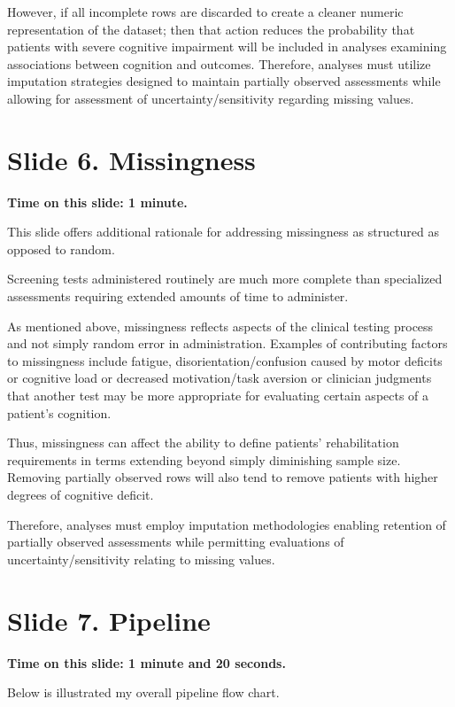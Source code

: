 \documentclass[
  11pt,
]{article}
\begin{document}
However, if all incomplete rows are discarded to create a cleaner
numeric representation of the dataset; then that action reduces the
probability that patients with severe cognitive impairment will be
included in analyses examining associations between cognition and
outcomes. Therefore, analyses must utilize imputation strategies
designed to maintain partially observed assessments while allowing for
assessment of uncertainty/sensitivity regarding missing values.

\section{Slide 6. Missingness}\label{slide-6.-missingness}

\textbf{Time on this slide: 1 minute.}

This slide offers additional rationale for addressing missingness as
structured as opposed to random.

Screening tests administered routinely are much more complete than
specialized assessments requiring extended amounts of time to
administer.

As mentioned above, missingness reflects aspects of the clinical testing
process and not simply random error in administration. Examples of
contributing factors to missingness include fatigue,
disorientation/confusion caused by motor deficits or cognitive load or
decreased motivation/task aversion or clinician judgments that another
test may be more appropriate for evaluating certain aspects of a
patient's cognition.

Thus, missingness can affect the ability to define patients'
rehabilitation requirements in terms extending beyond simply diminishing
sample size. Removing partially observed rows will also tend to remove
patients with higher degrees of cognitive deficit.

Therefore, analyses must employ imputation methodologies enabling
retention of partially observed assessments while permitting evaluations
of uncertainty/sensitivity relating to missing values.

\section{Slide 7. Pipeline}\label{slide-7.-pipeline}

\textbf{Time on this slide: 1 minute and 20 seconds.}

Below is illustrated my overall pipeline flow chart.
\end{document}
